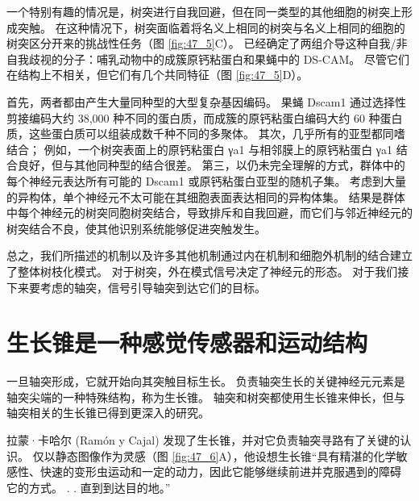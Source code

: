 一个特别有趣的情况是，树突进行自我回避，但在同一类型的其他细胞的树突上形成突触。
在这种情况下，树突面临着将名义上相同的树突与名义上相同的细胞的树突区分开来的挑战性任务（图 \ref{fig:47_5}C）。
已经确定了两组介导这种自我/非自我歧视的分子：哺乳动物中的成簇原钙粘蛋白和果蝇中的 DS-CAM。
尽管它们在结构上不相关，但它们有几个共同特征（图 \ref{fig:47_5}D）。


首先，两者都由产生大量同种型的大型复杂基因编码。
果蝇 Dscam1 通过选择性剪接编码大约 38,000 种不同的蛋白质，而成簇的原钙粘蛋白编码大约 60 种蛋白质，这些蛋白质可以组装成数千种不同的多聚体。
其次，几乎所有的亚型都同嗜结合；
例如，一个树突表面上的原钙粘蛋白 γa1 与相邻膜上的原钙粘蛋白 γa1 结合良好，但与其他同种型的结合很差。
第三，以仍未完全理解的方式，群体中的每个神经元表达所有可能的 Dscam1 或原钙粘蛋白亚型的随机子集。
考虑到大量的异构体，单个神经元不太可能在其细胞表面表达相同的异构体集。
结果是群体中每个神经元的树突同胞树突结合，导致排斥和自我回避，而它们与邻近神经元的树突结合不良，使其他识别系统能够促进突触发生。


总之，我们所描述的机制以及许多其他机制通过内在机制和细胞外机制的结合建立了整体树枝化模式。
对于树突，外在模式信号决定了神经元的形态。 对于我们接下来要考虑的轴突，信号引导轴突到达它们的目标。



\section{生长锥是一种感觉传感器和运动结构}

一旦轴突形成，它就开始向其突触目标生长。 负责轴突生长的关键神经元元素是轴突尖端的一种特殊结构，称为生长锥。 轴突和树突都使用生长锥来伸长，但与轴突相关的生长锥已得到更深入的研究。

拉蒙·卡哈尔 (Ramón y Cajal) 发现了生长锥，并对它负责轴突寻路有了关键的认识。 
仅以静态图像作为灵感（图 \ref{fig:47_6}A），他设想生长锥“具有精湛的化学敏感性、快速的变形虫运动和一定的动力，因此它能够继续前进并克服遇到的障碍 它的方式。 . . 直到到达目的地。”

